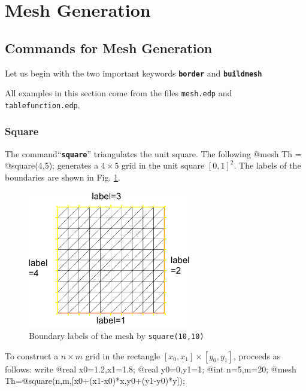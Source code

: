\documentclass[a4paper,twoside,12pt]{book}
\def\setS#1{#1\label{sec:#1}}
\begin{document}
\section{\setS{Mesh Generation}}
\subsection{Commands for Mesh Generation}\label{sec:InitialMesh}
Let us begin with the two important keywords \texttt{\bf border} and \texttt{\bf buildmesh}
%
%
%

All examples in this section come from the files \texttt{mesh.edp}
and \texttt{tablefunction.edp}.

\subsubsection{\setS{Square}}

The command``\texttt{\bf square}'' triangulates the unit square.
The following
\bFF
@mesh Th = @square(4,5);
\eFF
generates a $4\times 5$ grid in the unit square $[0,1]^2$. The labels of the boundaries
are shown in Fig. \ref{fig:square}.
\begin{figure}[htbp]
\begin{center}
  \includegraphics[height=6cm]{square}
\end{center}
  \caption{Boundary labels of the mesh by \texttt{square(10,10)}
  \label{fig:square}} 
\end{figure}
To construct a
$n\times m$ grid in the rectangle  $[x_0,x_1]\times [y_0,y_1]$, proceeds as follows:
write
\bFF
  @real x0=1.2,x1=1.8;
  @real y0=0,y1=1;
  @int n=5,m=20;
  @mesh Th=@square(n,m,[x0+(x1-x0)*x,y0+(y1-y0)*y]);
\end{document}
